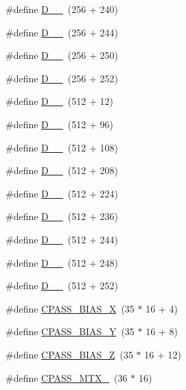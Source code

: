 \begin{DoxyCompactItemize}
\#define \hyperlink{group___d_r_i_v_e_r_s_ga9156998202039a8904e4733bd37faf4e}{D\+\_\+\_}~(256 + 240)
\item 
\#define \hyperlink{group___d_r_i_v_e_r_s_gaa65adef1ba1e6fd197e3058089c559fb}{D\+\_\+\_}~(256 + 244)
\item 
\#define \hyperlink{group___d_r_i_v_e_r_s_gab5988bd1329cb108a57a5e81ecd2c26b}{D\+\_\+\_}~(256 + 250)
\item 
\#define \hyperlink{group___d_r_i_v_e_r_s_ga0f11a9f42b3d13434b8a62aefd077912}{D\+\_\+\_}~(256 + 252)
\item 
\#define \hyperlink{group___d_r_i_v_e_r_s_ga57d4674cf7793419f7dfa54606c73bf2}{D\+\_\+\_}~(512 + 12)
\item 
\#define \hyperlink{group___d_r_i_v_e_r_s_ga36e10f13d70b3d8e038d39d807587202}{D\+\_\+\_}~(512 + 96)
\item 
\#define \hyperlink{group___d_r_i_v_e_r_s_ga09ccdf661a9ab9f8df8f2c7070d0dff9}{D\+\_\+\_}~(512 + 108)
\item 
\#define \hyperlink{group___d_r_i_v_e_r_s_gae2175af550784283fee34f3e67ba9c35}{D\+\_\+\_}~(512 + 208)
\item 
\#define \hyperlink{group___d_r_i_v_e_r_s_ga08f00bcef1e8814906c2354dc8b9e8b8}{D\+\_\+\_}~(512 + 224)
\item 
\#define \hyperlink{group___d_r_i_v_e_r_s_gafe0c8ed2924052fe714ec9174389bbe0}{D\+\_\+\_}~(512 + 236)
\item 
\#define \hyperlink{group___d_r_i_v_e_r_s_gaf53e9ad71a55861be572b74497681bb1}{D\+\_\+\_}~(512 + 244)
\item 
\#define \hyperlink{group___d_r_i_v_e_r_s_gab8953d8cd2c2dbeea3cc33ee50d0e3e1}{D\+\_\+\_}~(512 + 248)
\item 
\#define \hyperlink{group___d_r_i_v_e_r_s_ga94327b4d894185063c5104a02d9714ee}{D\+\_\+\_}~(512 + 252)
\item 
\#define \hyperlink{group___d_r_i_v_e_r_s_gaaf010f875dd67b0107be3e9fa31b3e27}{C\+P\+A\+S\+S\+\_\+\+B\+I\+A\+S\+\_\+X}~(35 $\ast$ 16 + 4)
\item 
\#define \hyperlink{group___d_r_i_v_e_r_s_ga6d24a81ab42b7fa4eb8139de1f61dabd}{C\+P\+A\+S\+S\+\_\+\+B\+I\+A\+S\+\_\+Y}~(35 $\ast$ 16 + 8)
\item 
\#define \hyperlink{group___d_r_i_v_e_r_s_gab931596f83f81d20cb6f79b99a6d71c7}{C\+P\+A\+S\+S\+\_\+\+B\+I\+A\+S\+\_\+Z}~(35 $\ast$ 16 + 12)
\item 
\#define \hyperlink{group___d_r_i_v_e_r_s_ga6a6966c355589a06d8fb29efaff9902f}{C\+P\+A\+S\+S\+\_\+\+M\+T\+X\+\_}~(36 $\ast$ 16)

\end{DoxyCompactItemize}
